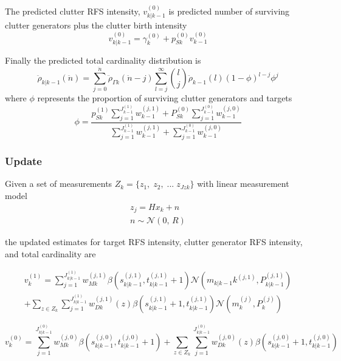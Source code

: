 \documentclass{article}
\newcommand{\clut}{{(0)}}
\newcommand{\tgt}{{(1)}}
\newcommand{\clutj}{{(j,0)}}
\newcommand{\tgtj}{{(j,1)}}
\begin{document}
The predicted clutter RFS intensity, $v_{k|k-1}^\clut$ is  predicted number of surviving clutter generators plus the clutter birth intensity \cite{cphd}
\begin{equation}
  \label{eq:lpd_v0_predict}
  v_{k|k-1}^\clut = \gamma_k^\clut + p_{Sk}^\clut v_{k-1}^\clut
\end{equation}

Finally the predicted total cardinality distribution is \cite{cphd}
\begin{equation}
  \label{eq:lpd_rho_predict}
 \ddot{\rho}_{k|k-1}(\ddot{n}) = \sum_{j=0}^{\ddot{n}}\ddot{\rho}_{\Gamma k}(\ddot{n} - j) \sum_{l=j}^\infty {l \choose j}\ddot{\rho}_{k-1}(l)(1-\phi)^{l-j}\phi^j
\end{equation}
where $\phi$ represents the proportion of surviving clutter generators and targets
\begin{equation}
  \label{eq:lpd_phi}
  \phi = \frac{p_{Sk}^\tgt\sum_{j=1}^{J_{k-1}^\tgt}w_{k-1}^\tgtj + P_{Sk}^\clut \sum_{j=1}^{J_{k-1}^\clut}w_{k-1}^\clutj}{\sum_{j=1}^{J_{k-1}^\tgt}w_{k-1}^\tgtj + \sum_{j=1}^{J_{k-1}^\clut}w_{k-1}^\clutj}
\end{equation}

\subsubsection{Update}

Given a set of measurements $Z_k = \{z_1,\;z_2,\;...\;z_{Jzk}\}$ with linear measurement model
\begin{align}
  \label{eq:lpd_z}
  z_j = Hx_k + n\\
  n\sim \mathcal{N}(0,\,R)
\end{align}

the updated estimates for target RFS intensity, clutter generator RFS intensity, and total cardinality are \cite{cphd}

\begin{equation}
  \label{eq:lpd_vk}
  \begin{aligned}
    v^\tgt_k = \sum_{j=1}^{J_{k|k-1}^\tgt}w_{Mk}^\tgtj \beta(s_{k|k-1}^{(j, 1)}, t_{k|k-1}^{(j, 1)}+1) \mathcal{N}(m_{k|k-1}k^\tgtj,P_{k|k-1}^\tgtj) \\
    + \sum_{z \in Z_k}\sum_{j=1}^{J_{k|k-1}^\tgt}w_{Dk}^\tgtj(z) \beta(s_{k|k-1}^{(j, 1)}+1, t_{k|k-1}^{(j, 1)})  \mathcal{N}(m_k^{(j)},P_k^{(j)})
  \end{aligned}
\end{equation}

\begin{equation}
  \label{eq:N0k}
  v^\clut_k = \sum_{j=1}^{J_{k|k-1}^\clut}w_{Mk}^\clutj \beta(s_{k|k-1}^\clutj, t_{k|k-1}^\clutj+1)
  + \sum_{z \in Z_k}\sum_{j=1}^{J_{k|k-1}^\clut}w_{Dk}^\clutj(z) \beta(s_{k|k-1}^\clutj+1, t_{k|k-1}^\clutj)  
\end{equation}
  
\end{document}
